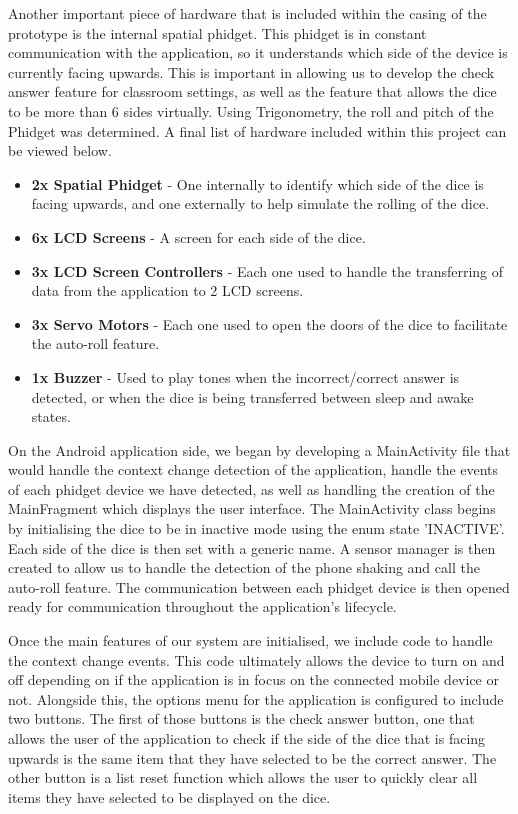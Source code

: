 \documentclass{sigchi}
\begin{document}
Another important piece of hardware that is included within the casing of the prototype is the internal spatial phidget. This phidget is in constant communication with the application, so it understands which side of the device is currently facing upwards. This is important in allowing us to develop the check answer feature for classroom settings, as well as the feature that allows the dice to be more than 6 sides virtually. Using Trigonometry, the roll and pitch of the Phidget was determined. A final list of hardware included within this project can be viewed below.

\begin{itemize}
    \item \textbf{2x Spatial Phidget} - One internally to identify which side of the dice is facing upwards, and one externally to help simulate the rolling of the dice.
    \item \textbf{6x LCD Screens} - A screen for each side of the dice.
    \item \textbf{3x LCD Screen Controllers} - Each one used to handle the transferring of data from the application to 2 LCD screens.
    \item \textbf{3x Servo Motors} - Each one used to open the doors of the dice to facilitate the auto-roll feature.
    \item \textbf{1x Buzzer} - Used to play tones when the incorrect/correct answer is detected, or when the dice is being transferred between sleep and awake states.
  \end{itemize}

On the Android application side, we began by developing a MainActivity file that would handle the context change detection of the application, handle the events of each phidget device we have detected, as well as handling the creation of the MainFragment which displays the user interface. The MainActivity class begins by initialising the dice to be in inactive mode using the enum state 'INACTIVE'. Each side of the dice is then set with a generic name. A sensor manager is then created to allow us to handle the detection of the phone shaking and call the auto-roll feature. The communication between each phidget device is then opened ready for communication throughout the application's lifecycle. 

Once the main features of our system are initialised, we include code to handle the context change events. This code ultimately allows the device to turn on and off depending on if the application is in focus on the connected mobile device or not. Alongside this, the options menu for the application is configured to include two buttons. The first of those buttons is the check answer button, one that allows the user of the application to check if the side of the dice that is facing upwards is the same item that they have selected to be the correct answer. The other button is a list reset function which allows the user to quickly clear all items they have selected to be displayed on the dice.
\end{document}
